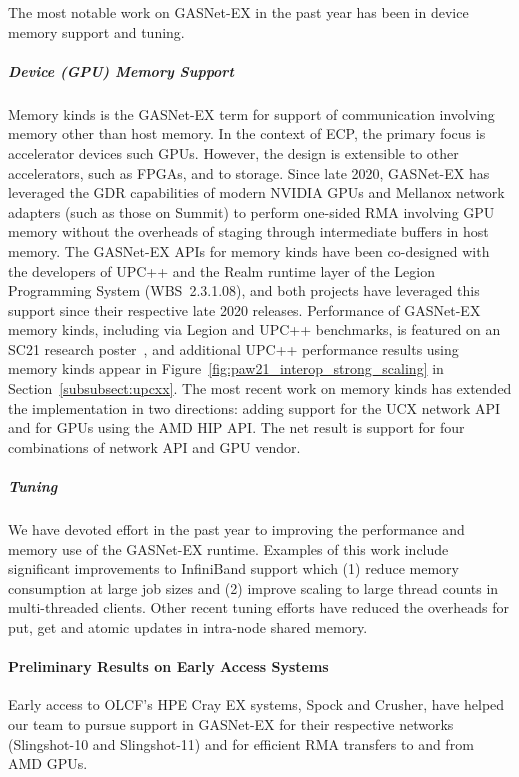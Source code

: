 The most notable work on GASNet-EX in the past year has been in device memory support and tuning.

\subparagraph{Device (GPU) Memory Support}
Memory kinds is the GASNet-EX term for support of communication involving
memory other than host memory.  In the context of ECP, the primary focus is
accelerator devices such GPUs.  However, the design is extensible to other
accelerators, such as FPGAs, and to storage.
Since late 2020, GASNet-EX has leveraged the GDR
capabilities of modern NVIDIA GPUs and Mellanox network adapters (such as those
on Summit) to perform one-sided RMA involving GPU memory without
the overheads of staging through intermediate buffers in host memory.
The GASNet-EX APIs for memory kinds have been co-designed with the developers
of UPC++ and the Realm runtime layer of the Legion Programming System
(WBS~2.3.1.08), and both projects have leveraged this support since
their respective late 2020 releases.
Performance of GASNet-EX memory kinds, including via Legion and UPC++
benchmarks, is featured on an SC21 research poster~\cite{gasnet-poster-sc21},
and additional UPC++ performance results using memory kinds appear in
Figure~\ref{fig:paw21_interop_strong_scaling} in
Section~\ref{subsubsect:upcxx}.
The most recent work on memory kinds has extended the implementation in two directions:
adding support for the UCX network API and for GPUs using the AMD HIP API.
The net result is support for four combinations of network API and GPU vendor.

\subparagraph{Tuning}
We have devoted effort in the past year to improving the performance and memory
use of the GASNet-EX runtime.  Examples of this work include significant
improvements to InfiniBand support which (1) reduce memory consumption at large
job sizes and (2) improve scaling to large thread counts in multi-threaded
clients.  Other recent tuning efforts have reduced the overheads for put, get
and atomic updates in intra-node shared memory.

\paragraph{Preliminary Results on Early Access Systems}

Early access to OLCF's HPE Cray EX systems, Spock and Crusher, have helped our
team to pursue support in GASNet-EX for their respective networks (Slingshot-10
and Slingshot-11) and for efficient RMA transfers to and from AMD GPUs.

